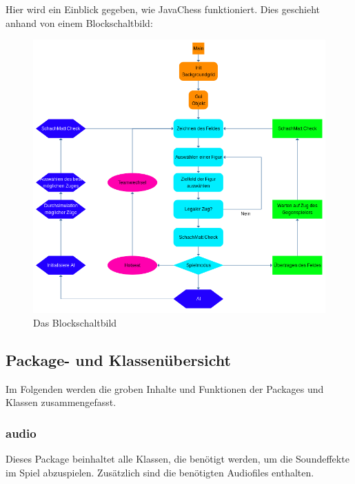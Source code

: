 \documentclass[12pt,a4paper]{article}
\begin{document}
Hier wird ein Einblick gegeben, wie JavaChess funktioniert. Dies geschieht anhand von einem Blockschaltbild: \\
\vspace{1cm}


\begin{figure}[H]
  \centering
   	\includegraphics[width=16cm]{graphics/block.png}
  \caption{Das Blockschaltbild}
  \label{fig:block}
\end{figure}

\newpage
\subsection{Package- und Klassenübersicht}
\label{SUBSEC:PACKAGE}

Im Folgenden werden die groben Inhalte und Funktionen der Packages und Klassen zusammengefasst.\

\subsubsection{audio}

Dieses Package beinhaltet alle Klassen, die benötigt werden, um die Soundeffekte im Spiel abzuspielen. Zusätzlich sind die benötigten Audiofiles enthalten.\
\end{document}
